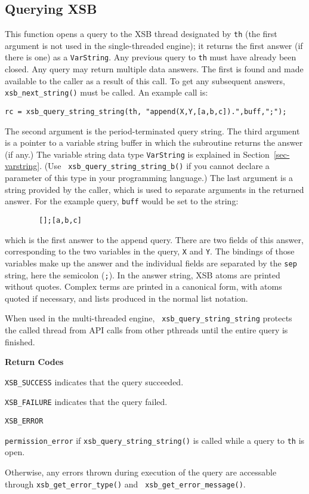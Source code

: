 \subsection{Querying XSB}

\begin{description}
%
This function opens a query to the XSB thread designated by {\tt th}
(the first argument is not used in the single-threaded engine); it
returns the first answer (if there is one) as a {\tt VarString}.  Any
previous query to {\tt th} must have already been closed.  Any query
may return multiple data answers.  The first is found and made
available to the caller as a result of this call.  To get any
subsequent answers, {\tt xsb\_next\_string()} must be called.  An
example call is:
\begin{verbatim}
rc = xsb_query_string_string(th, "append(X,Y,[a,b,c]).",buff,";");
\end{verbatim}
The second argument is the period-terminated query string.  The third
argument is a pointer to a variable string buffer in which the
subroutine returns the answer (if any.) The variable string data type
{\tt VarString} is explained in Section~\ref{sec-varstring}. (Use {\tt
  xsb\_query\_string\_string\_b()} if you cannot declare a parameter
of this type in your programming language.)  The last argument is a
string provided by the caller, which is used to separate arguments in
the returned answer.  For the example query, {\tt buff} would be set
to the string:
\begin{verbatim}
        [];[a,b,c]
\end{verbatim}
which is the first answer to the append query.  There are two fields
of this answer, corresponding to the two variables in the query,
\verb|X| and \verb|Y|.  The bindings of those variables make up the
answer and the individual fields are separated by the \verb|sep|
string, here the semicolon (\verb|;|).  In the answer string, XSB
atoms are printed without quotes.  Complex terms are printed in a
canonical form, with atoms quoted if necessary, and lists produced in
the normal list notation.

When used in the multi-threaded engine, {\tt
  xsb\_query\_string\_string} protects the called thread from API
calls from other pthreads until the entire query is finished.

{\bf Return Codes}  
\bi
\item {\tt XSB\_SUCCESS} indicates that the query succeeded.
%
\item {\tt XSB\_FAILURE} indicates that the query failed.
%
\item {\tt XSB\_ERROR} 
\bi
\item {\tt permission\_error} if {\tt xsb\_query\_string\_string()} is
  called while a query to {\tt th} is open.
%
\item Otherwise, any errors thrown during execution of the query are
  accessable through {\tt xsb\_get\_error\_type()} and {\tt
    xsb\_get\_error\_message()}.  
\ei 
\ei


\end{description}
